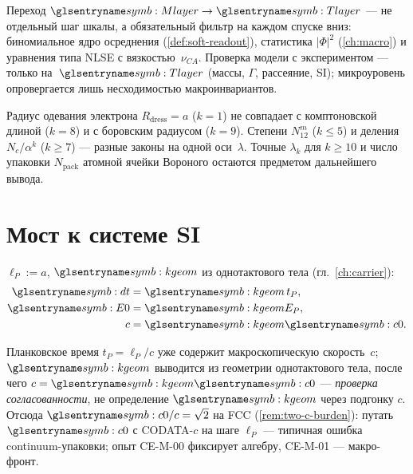 Переход $\Mlayer\to\Tlayer$ --- не отдельный шаг шкалы, а обязательный фильтр на каждом спуске вниз:
биномиальное ядро осреднения (\cref{def:soft-readout}), статистика $|\Phi|^2$ (\cref{ch:macro})
и уравнения типа NLSE с вязкостью~$\nu_{CA}$.
Проверка модели с экспериментом --- только на~$\Tlayer$ (массы, $\Gamma$, рассеяние, SI);
микроуровень опровергается лишь несходимостью макроинвариантов.

\begin{remark}
Радиус одевания электрона $R_{\mathrm{dress}}=a$ ($k=1$) не совпадает
с комптоновской длиной ($k=8$) и с боровским радиусом ($k=9$).
Степени $N_{12}^{m}$ ($k\leq 5$) и деления $N_c/\alpha^{k}$ ($k\geq 7$) ---
разные законы на одной оси~$\lambda$.
Точные $\lambda_k$ для $k\geq 10$ и число упаковки $N_{\mathrm{pack}}$
атомной ячейки Вороного остаются предметом дальнейшего вывода.
\end{remark}

\section{Мост к системе SI}

\begin{definition}
\label{def:si-bridge}
$\ell_P:=a$, $\caKappaGeom$ из однотактового тела (гл.~\ref{ch:carrier}):
\begin{align}
  \htick &= \caKappaGeom\, t_P, \\
  \ladderEnergy &= \caKappaGeom E_P, \\
  c &= \caKappaGeom \caSignalSpeed.
\end{align}
\end{definition}

Планковское время $t_P=\ell_P/c$ уже содержит макроскопическую скорость~$c$;
$\caKappaGeom$ выводится из геометрии однотактового тела, после чего $c=\caKappaGeom \caSignalSpeed$ ---
\emph{проверка согласованности}, не определение $\caKappaGeom$ через подгонку $c$.
Отсюда $\caSignalSpeed/c=\sqrt{2}$ на FCC (\cref{rem:two-c-burden}): путать $\caSignalSpeed$ с CODATA-$c$
на шаге $\ell_P$ --- типичная ошибка continuum-упаковки; опыт CE-M-00 фиксирует алгебру, CE-M-01 --- макро-фронт.

